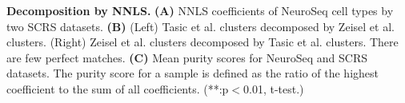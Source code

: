 \textbf{Decomposition by NNLS.}
\textbf{(A)} NNLS coefficients of NeuroSeq cell types by two SCRS datasets.
\textbf{(B)} (Left) Tasic et al. clusters decomposed by Zeisel et al. clusters. (Right) Zeisel et al. clusters decomposed by Tasic et al. clusters. There are few perfect matches.
\textbf{(C)} Mean purity scores for NeuroSeq and SCRS datasets. The purity score for a sample is defined as the ratio of the highest coefficient to the sum of all coefficients. (**:p$<$0.01, t-test.)



